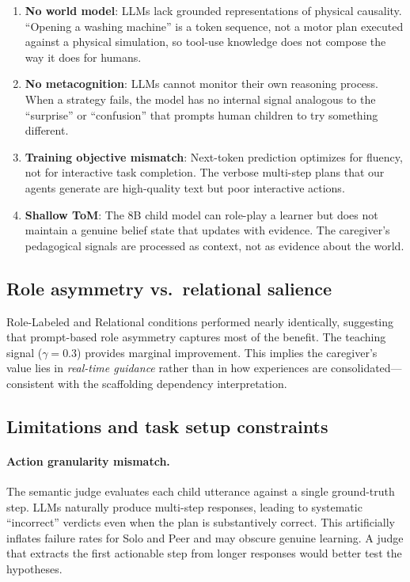 \documentclass{article}
\begin{document}
\begin{enumerate}[leftmargin=*,itemsep=1pt]
    \item \textbf{No world model}: LLMs lack grounded representations of physical causality. ``Opening a washing machine'' is a token sequence, not a motor plan executed against a physical simulation, so tool-use knowledge does not compose the way it does for humans.
    \item \textbf{No metacognition}: LLMs cannot monitor their own reasoning process. When a strategy fails, the model has no internal signal analogous to the ``surprise'' or ``confusion'' that prompts human children to try something different.
    \item \textbf{Training objective mismatch}: Next-token prediction optimizes for fluency, not for interactive task completion. The verbose multi-step plans that our agents generate are high-quality text but poor interactive actions.
    \item \textbf{Shallow ToM}: The 8B child model can role-play a learner but does not maintain a genuine belief state that updates with evidence. The caregiver's pedagogical signals are processed as context, not as evidence about the world.
\end{enumerate}

\subsection{Role asymmetry vs.\ relational salience}

Role-Labeled and Relational conditions performed nearly identically, suggesting that prompt-based role asymmetry captures most of the benefit. The teaching signal ($\gamma = 0.3$) provides marginal improvement. This implies the caregiver's value lies in \emph{real-time guidance} rather than in how experiences are consolidated---consistent with the scaffolding dependency interpretation.

\subsection{Limitations and task setup constraints}
\label{sec:limitations}

\paragraph{Action granularity mismatch.} The semantic judge evaluates each child utterance against a single ground-truth step. LLMs naturally produce multi-step responses, leading to systematic ``incorrect'' verdicts even when the plan is substantively correct. This artificially inflates failure rates for Solo and Peer and may obscure genuine learning. A judge that extracts the first actionable step from longer responses would better test the hypotheses.
\end{document}
